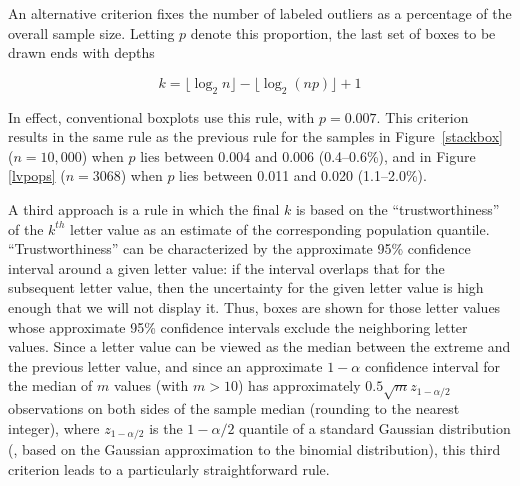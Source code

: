 \documentclass[oneside]{article}
\begin{document}
An alternative criterion fixes the number of labeled outliers as a percentage of the overall sample size. Letting $p$ denote this proportion, the last set of boxes to be drawn ends with depths

\begin{equation}
k = \lfloor \log_2 n \rfloor - \lfloor \log_2 (np) \rfloor + 1
\end{equation}

\noindent In effect, conventional boxplots use this rule, with $p = 0.007$. This criterion results in the same rule as the previous rule for the samples in Figure~\ref{stackbox} ($n = 10,000$) when $p$ lies between 0.004 and 0.006 (0.4--0.6\%), and in Figure \ref{lvpops} ($n = 3068$) when $p$ lies between 0.011 and 0.020 (1.1--2.0\%).

A third approach is a rule in which the final $k$ is based on the ``trustworthiness'' of the $k^{th}$ letter value as an estimate of the corresponding population quantile. ``Trustworthiness'' can be characterized by the approximate 95\% confidence interval around a given letter value: if the interval overlaps that for the subsequent letter value, then the uncertainty for the given letter value is high enough that we will not display it. Thus, boxes are shown for those letter values whose approximate 95\% confidence intervals exclude the neighboring letter values. Since a letter value can be viewed as the median between the extreme and the previous letter value, and since an approximate $1-\alpha$ confidence interval for the median of $m$ values (with $m > 10$) has approximately $0.5 \sqrt{m} z_{1-\alpha/2}$ observations on both sides of the sample median (rounding to the nearest integer), where $z_{1-\alpha/2}$ is the ${1-\alpha/2}$ quantile of a standard Gaussian distribution (\citet[161]{ha.order}, based on the Gaussian approximation to the binomial distribution), this third criterion leads to a particularly straightforward rule.

\end{document}
